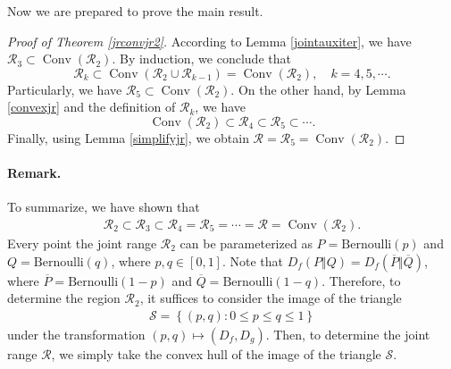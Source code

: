 \documentclass{article}
\numberwithin{equation}{section}
\renewcommand{\cal}{\mathcal}
\newcommand{\ol}{\overline}
\DeclareMathOperator{\conv}{Conv}
\theoremstyle{plain}
\theoremstyle{definition}
\begin{document}
Now we are prepared to prove the main result.

\begin{proof}[Proof of Theorem \ref{jrconvjr2}]
According to Lemma \ref{jointauxiter}, we have $\cal{R}_3\subset\conv(\cal{R}_2)$. By induction, we conclude that $$\cal{R}_k\subset\conv(\cal{R}_2\cup\cal{R}_{k-1})=\conv(\cal{R}_2),\quad k=4,5,\cdots.$$
Particularly, we have $\cal{R}_5\subset\conv(\cal{R}_2)$. On the other hand, by Lemma \ref{convexjr} and the definition of $\cal{R}_k$, we have $$\conv(\cal{R}_2)\subset\cal{R}_4\subset\cal{R}_5\subset\cdots.$$ 
Finally, using Lemma \ref{simplifyjr}, we obtain $\cal{R}=\cal{R}_5=\conv(\cal{R}_2)$.
\end{proof}
\paragraph{Remark.} To summarize, we have shown that
\begin{align*}
	\cal{R}_2\subset\cal{R}_3\subset\cal{R}_4=\cal{R}_5=\cdots=\cal{R}=\conv(\cal{R}_2).
\end{align*}
Every point the joint range $\cal{R}_2$ can be parameterized as $P=\mathrm{Bernoulli}(p)$ and $Q=\mathrm{Bernoulli}(q)$, where $p,q\in[0,1]$. Note that $D_f(P\Vert Q)=D_f(\ol{P}\Vert\ol{Q})$, where $\ol{P}=\mathrm{Bernoulli}(1-p)$ and $\ol{Q}=\mathrm{Bernoulli}(1-q)$. Therefore, to determine the region $\cal{R}_2$, it suffices to consider the image of the triangle
\begin{align*}
	\cal{S}=\left\{(p,q):0\leq p\leq q\leq 1\right\}
\end{align*}
under the transformation $(p,q)\mapsto (D_f,D_g)$. Then, to determine the joint range $\cal{R}$, we simply take the convex hull of the image of the triangle $\cal{S}$.
\end{document}
